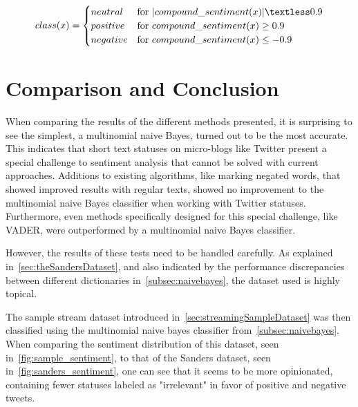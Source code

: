 \begin{equation}
   class(x) =
   \begin{cases}
     neutral & \text{for } |compound\_sentiment(x)| \textless 0.9 \\
     positive & \text{for } compound\_sentiment(x) \geq 0.9 \\
     negative & \text{for } compound\_sentiment(x) \leq -0.9 \\
   \end{cases}
\end{equation}

\section{Comparison and Conclusion}
\label{sec:comparison}

When comparing the results of the different methods presented, it is surprising to see the simplest,
a multinomial naive Bayes, turned out to be the most accurate.\\
This indicates that short text statuses on micro-blogs like Twitter present a special challenge to sentiment analysis
that cannot be solved with current approaches.
Additions to existing algorithms, like marking negated words, that showed improved results with regular texts,
showed no improvement to the multinomial naive Bayes classifier when working with Twitter statuses.
Furthermore, even methods specifically designed for this special challenge, like VADER,
were outperformed by a multinomial naive Bayes classifier.
\par
However, the results of these tests need to be handled carefully.
As explained in~\ref{sec:theSandersDataset},
and also indicated by the performance discrepancies between different dictionaries in~\ref{subsec:naivebayes},
the dataset used is highly topical.
\par
The sample stream dataset introduced in~\ref{sec:streamingSampleDataset} was then classified using the multinomial naive bayes classifier from~\ref{subsec:naivebayes}.
When comparing the sentiment distribution of this dataset, seen in~\ref{fig:sample_sentiment},
to that of the Sanders dataset, seen in~\ref{fig:sanders_sentiment},
one can see that it seems to be more opinionated,
containing fewer statuses labeled as "irrelevant" in favor of positive and negative tweets.

